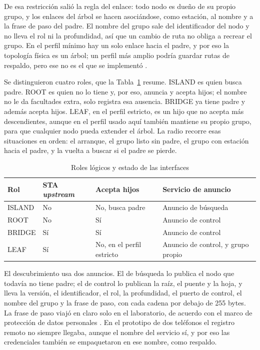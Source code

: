 \documentclass[12pt,oneside]{scrreprt}
\begin{document}
De esa restricción salió la regla del enlace: todo nodo es dueño de su propio grupo, y los enlaces del árbol se hacen asociándose, como estación, al nombre y a la frase de paso del padre. El nombre del grupo sale del identificador del nodo y no lleva el rol ni la profundidad, así que un cambio de ruta no obliga a recrear el grupo. En el perfil mínimo hay un solo enlace hacia el padre, y por eso la topología física es un árbol; un perfil más amplio podría guardar rutas de respaldo, pero ese no es el que se implementó \parencite{Akyildiz2005}.

Se distinguieron cuatro roles, que la Tabla~\ref{tab:met-roles-logicos} resume. ISLAND es quien busca padre. ROOT es quien no lo tiene y, por eso, anuncia y acepta hijos; el nombre no le da facultades extra, solo registra esa ausencia. BRIDGE ya tiene padre y además acepta hijos. LEAF, en el perfil estricto, es un hijo que no acepta más descendientes, aunque en el perfil usado aquí también mantiene su propio grupo, para que cualquier nodo pueda extender el árbol. La radio recorre esas situaciones en orden: el arranque, el grupo listo sin padre, el grupo con estación hacia el padre, y la vuelta a buscar si el padre se pierde.

\begin{table}[H]
\centering
\singlespacing
\caption{Roles lógicos y estado de las interfaces}
\label{tab:met-roles-logicos}
\renewcommand{\arraystretch}{1.15}
\begin{tabularx}{\textwidth}{@{} >{\raggedright\arraybackslash}p{1.8cm} >{\raggedright\arraybackslash}p{2.4cm} >{\raggedright\arraybackslash}p{2.6cm} X @{}}
\toprule
Rol & STA \textit{upstream} & Acepta hijos & Servicio de anuncio \\
\midrule
ISLAND & No & No, busca padre & Anuncio de búsqueda \\
ROOT   & No & Sí & Anuncio de control \\
BRIDGE & Sí & Sí & Anuncio de control \\
LEAF   & Sí & No, en el perfil estricto & Anuncio de control, y grupo propio \\
\bottomrule
\end{tabularx}
\end{table}

El descubrimiento usa dos anuncios. El de búsqueda lo publica el nodo que todavía no tiene padre; el de control lo publican la raíz, el puente y la hoja, y lleva la versión, el identificador, el rol, la profundidad, el puerto de control, el nombre del grupo y la frase de paso, con cada cadena por debajo de 255 bytes. La frase de paso viajó en claro solo en el laboratorio, de acuerdo con el marco de protección de datos personales \parencite{CongresoRepublica2012a}. En el prototipo de dos teléfonos el registro remoto no siempre llegaba, aunque el nombre del servicio sí, y por eso las credenciales también se empaquetaron en ese nombre, como respaldo.
\end{document}
